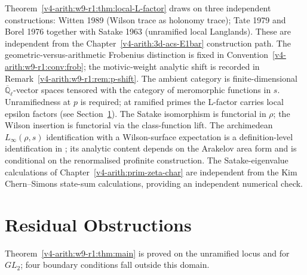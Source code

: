 \begin{remark}
\label{v4-arith:w9-r1:rem:langlands-sources}
Theorem~\ref{v4-arith:w9-r1:thm:local-L-factor} draws on three
independent constructions: Witten 1989 (Wilson trace as holonomy
trace); Tate 1979 and Borel 1976 together with Satake 1963 (unramified
local Langlands). These are independent from the Chapter~\ref{v4-arith:3d-acs-E1bar}
construction path.
The geometric-versus-arithmetic Frobenius distinction is fixed in
Convention~\ref{v4-arith:w9-r1:conv:frob}; the motivic-weight analytic
shift is recorded in Remark~\ref{v4-arith:w9-r1:rem:p-shift}.
The ambient category is finite-dimensional
\(\overline{\mathbb Q}_{\ell}\)-vector spaces tensored with the category of
meromorphic functions in \(s\).
Unramifiedness at \(p\) is required; at ramified primes the L-factor
carries local epsilon factors (see Section~\ref{v4-arith:w9-r1:sec:residual}).
The Satake isomorphism is functorial in \(\rho\); the Wilson insertion
is functorial via the class-function lift.
The archimedean \(L_{\infty}(\rho,s)\) identification with a
Wilson-surface expectation is a definition-level identification in
; its analytic content depends on
the Arakelov area form and is conditional on the renormalised profinite
construction.
The Satake-eigenvalue calculations of
Chapter~\ref{v4-arith:prim-zeta-char} are independent from the Kim
Chern--Simons state-sum calculations, providing an independent numerical check.
\end{remark}

\section{Residual Obstructions}
\label{v4-arith:w9-r1:sec:residual}

Theorem~\ref{v4-arith:w9-r1:thm:main} is proved on the unramified locus
and for \(GL_{2}\); four boundary conditions fall outside this domain.

